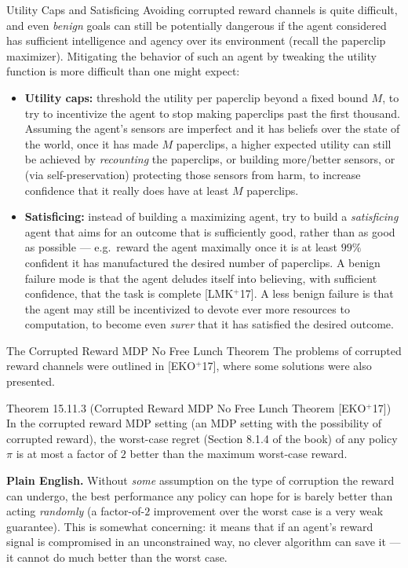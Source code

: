 \documentclass[aspectratio=169,10pt]{beamer}
\begin{document}
\begin{frame}{Utility Caps and Satisficing}
  Avoiding corrupted reward channels is quite difficult, and even
  \emph{benign} goals can still be potentially dangerous if the agent
  considered has sufficient intelligence and agency over its environment
  (recall the paperclip maximizer). Mitigating the behavior of such an
  agent by tweaking the utility function is more difficult than one might
  expect:
  \begin{itemize}
    \item \textbf{Utility caps:} threshold the utility per paperclip
      beyond a fixed bound $M$, to try to incentivize the agent to stop
      making paperclips past the first thousand. Assuming the agent's
      sensors are imperfect and it has beliefs over the state of the
      world, once it has made $M$ paperclips, a higher expected utility
      can still be achieved by \emph{recounting} the paperclips, or
      building more/better sensors, or (via self-preservation) protecting
      those sensors from harm, to increase confidence that it really does
      have at least $M$ paperclips.
    \item \textbf{Satisficing:} instead of building a maximizing agent,
      try to build a \emph{satisficing} agent that aims for an outcome
      that is sufficiently good, rather than as good as possible --- e.g.\
      reward the agent maximally once it is at least $99\%$ confident it
      has manufactured the desired number of paperclips. A benign failure
      mode is that the agent deludes itself into believing, with
      sufficient confidence, that the task is complete [LMK$^+$17]. A less
      benign failure is that the agent may still be incentivized to devote
      ever more resources to computation, to become even \emph{surer}
      that it has satisfied the desired outcome.
  \end{itemize}
\end{frame}

\begin{frame}{The Corrupted Reward MDP No Free Lunch Theorem}
  The problems of corrupted reward channels were outlined in
  [EKO$^+$17], where some solutions were also presented.

  \begin{block}{Theorem 15.11.3 (Corrupted Reward MDP No Free Lunch Theorem [EKO$^+$17])}
    In the corrupted reward MDP setting (an MDP setting with the
    possibility of corrupted reward), the worst-case regret (Section
    8.1.4 of the book) of any policy $\pi$ is at most a factor of $2$
    better than the maximum worst-case reward.
  \end{block}

  \textbf{Plain English.} Without \emph{some} assumption on the type of
  corruption the reward can undergo, the best performance any policy can
  hope for is barely better than acting \emph{randomly} (a factor-of-$2$
  improvement over the worst case is a very weak guarantee). This is
  somewhat concerning: it means that if an agent's reward signal is
  compromised in an unconstrained way, no clever algorithm can save it
  --- it cannot do much better than the worst case.
\end{frame}
\end{document}
